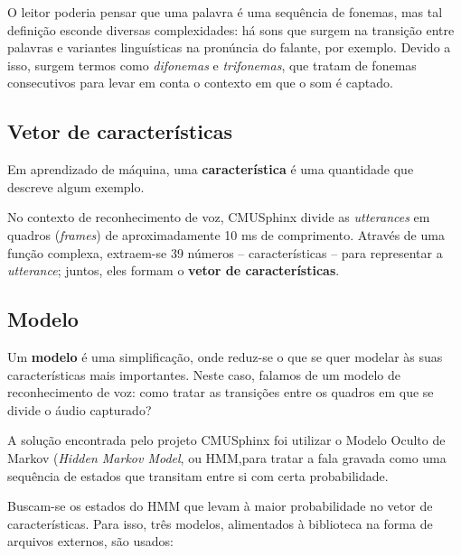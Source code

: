 O leitor poderia pensar que uma palavra é uma sequência de fonemas, mas tal definição esconde diversas complexidades: há sons que surgem na transição entre palavras e variantes linguísticas na pronúncia do falante, por exemplo. Devido a isso, surgem termos como \textit{difonemas} e \textit{trifonemas}, que tratam de fonemas consecutivos para levar em conta o contexto em que o som é captado.


\subsection{Vetor de características}

Em aprendizado de máquina, uma \textbf{característica} é uma quantidade que descreve algum exemplo.

No contexto de reconhecimento de voz, CMUSphinx divide as \textit{utterances} em quadros (\textit{frames}) de aproximadamente 10 ms de comprimento. Através de uma função complexa, extraem-se 39 números -- características -- para representar a \textit{utterance}; juntos, eles formam o \textbf{vetor de características}.


\subsection{Modelo}
\label{pocketsphinx-models}

Um \textbf{modelo} é uma simplificação, onde reduz-se o que se quer modelar às suas características mais importantes. Neste caso, falamos de um modelo de reconhecimento de voz: como tratar as transições entre os quadros em que se divide o áudio capturado?

A solução encontrada pelo projeto CMUSphinx foi utilizar o Modelo Oculto de Markov (\textit{Hidden Markov Model}, ou HMM,\iffalse conforme visto na seção \ref{cap:hmm})\fi para tratar a fala gravada como uma sequência de estados que transitam entre si com certa probabilidade.

Buscam-se os estados do HMM que levam à maior probabilidade no vetor de características. Para isso, três modelos, alimentados à biblioteca na forma de arquivos externos, são usados:

